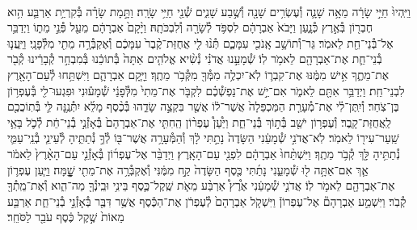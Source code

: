 \documentclass[twoside, openany, parskip=half, 11pt]{book}
\begin{document}
\begin{footnotesize}
\begin{multicols}{2}
\\
וַיִּֽהְיוּ֙ חַיֵּ֣י שָׂרָ֔ה מֵאָ֥ה שָׁנָ֛ה וְ֯עֶשְׂרִ֥ים שָׁנָ֖ה וְ֯שֶׁ֣בַע שָׁנִ֑ים שְׁ֯נֵ֖י חַיֵּ֥י שָׂרָֽה׃ וַתָּ֣מָת שָׂרָ֗ה בְּ֯קִרְיַ֥ת אַרְבַּ֛ע הִ֥וא חֶבְר֖וֹן בְּ֯אֶ֣רֶץ כְּ֯נָ֑עַן וַיָּבֹא֙ אַבְרָהָ֔ם לִסְפֹּ֥ד לְ֯שָׂרָ֖ה וְ֯לִבְכֹּתָֽהּ׃ וַיָּ֨קָם֙ אַבְרָהָ֔ם מֵעַ֖ל פְּ֯נֵ֣י מֵת֑וֹ וַיְדַבֵּ֥ר אֶל־בְּ֯נֵי־חֵ֖ת לֵאמֹֽר׃ גֵּר־וְ֯תוֹשָׁ֥ב אָֽנֹכִ֖י עִמָּכֶ֑ם תְּ֯נ֨וּ לִ֤י אֲחֻזַּת־קֶ֨בֶר֙ עִמָּכֶ֔ם וְ֯אֶקְבְּ֯רָ֥ה מֵתִ֖י מִלְּ֯פָנָֽי׃ וַיַּֽעֲנ֧וּ בְ֯נֵי־חֵ֛ת אֶת־אַבְרָהָ֖ם לֵאמֹ֥ר לֽוֹ׃ שְׁ֯מָעֵ֣נוּ אֲדֹנִ֗י נְ֯שִׂ֨יא אֱלֹהִ֤ים אַתָּה֙ בְּ֯תוֹכֵ֔נוּ בְּ֯מִבְחַ֣ר קְ֯בָרֵ֔ינוּ קְ֯בֹ֖ר אֶת־מֵתֶ֑ךָ אִ֣ישׁ מִמֶּ֔נּוּ אֶת־קִבְר֛וֹ לֹֽא־יִכְלֶ֥ה מִמְּ֯ךָ֖ מִקְּ֯בֹ֥ר מֵתֶֽךָ׃ וַיָּ֧קָם אַבְרָהָ֛ם וַיִּשְׁתַּ֥חוּ לְ֯עַם־הָאָ֖רֶץ לִבְנֵי־חֵֽת׃  וַיְדַבֵּ֥ר אִתָּ֖ם לֵאמֹ֑ר אִם־יֵ֣שׁ אֶת־נַפְשְׁ֯כֶ֗ם לִקְבֹּ֤ר אֶת־מֵתִי֙ מִלְּ֯פָנַ֔י שְׁ֯מָע֕וּנִי וּפִגְעוּ־לִ֖י בְּ֯עֶפְר֥וֹן בֶּן־צֹֽחַר׃ וְ֯יִֽתֶּן־לִ֗י אֶת־מְ֯עָרַ֤ת הַמַּכְפֵּלָה֙ אֲשֶׁר־ל֔וֹ אֲשֶׁ֖ר בִּקְצֵ֣ה שָׂדֵ֑הוּ בְּ֯כֶ֨סֶף מָלֵ֜א יִתְּ֯נֶ֥נָּה לִּ֛י בְּ֯תֽוֹכֲכֶ֖ם לַֽאֲחֻזַּת־קָֽבֶר׃ וְ֯עֶפְר֥וֹן יֹשֵׁ֖ב בְּ֯ת֣וֹךְ בְּ֯נֵי־חֵ֑ת וַיַּ֩עַן֩ עֶפְר֨וֹן הַֽחִתִּ֤י אֶת־אַבְרָהָם֙ בְּ֯אָזְ֯נֵ֣י בְ֯נֵי־חֵ֔ת לְ֯כֹ֛ל בָּאֵ֥י שַֽׁעַר־עִיר֖וֹ לֵאמֹֽר׃ לֹֽא־אֲדֹנִ֣י שְׁ֯מָעֵ֔נִי הַשָּׂדֶה֙ נָתַ֣תִּי לָ֔ךְ וְ֯הַמְּ֯עָרָ֥ה אֲשֶׁר־בּ֖וֹ לְ֯ךָ֣ נְ֯תַתִּ֑יהָ לְ֯עֵינֵ֧י בְ֯נֵֽי־עַמִּ֛י נְ֯תַתִּ֥יהָ לָּ֖ךְ קְ֯בֹ֥ר מֵתֶֽךָ׃ וַיִּשְׁתַּ֨חוּ֙ אַבְרָהָ֔ם לִפְנֵ֖י עַם־הָאָֽרֶץ׃  וַיְדַבֵּ֨ר אֶל־עֶפְר֜וֹן בְּ֯אָזְ֯נֵ֤י עַם־הָאָ֨רֶץ֙ לֵאמֹ֔ר אַ֛ךְ אִם־אַתָּ֥ה ל֖וּ שְׁ֯מָעֵ֑נִי נָתַ֜תִּי כֶּ֤סֶף הַשָּׂדֶה֙ קַ֣ח מִמֶּ֔נִּי וְ֯אֶקְבְּ֯רָ֥ה אֶת־מֵתִ֖י שׇׇׇׇׇׇׇׇֽׁמָּה׃ וַיַּ֧עַן עֶפְר֛וֹן אֶת־אַבְרָהָ֖ם לֵאמֹ֥ר לֽוֹ׃ אֲדֹנִ֣י שְׁ֯מָעֵ֔נִי אֶ֩רֶץ֩ אַרְבַּ֨ע מֵאֹ֧ת שֶֽׁקֶל־כֶּ֛סֶף בֵּינִ֥י וּבֵֽינְ֯ךָ֖ מַה־הִ֑וא וְ֯אֶת־מֵֽתְ֯ךָ֖ קְ֯בֹֽר׃ וַיִּשְׁמַ֣ע אַבְרָהָם֘ אֶל־עֶפְרוֹן֒ וַיִּשְׁקֹ֤ל אַבְרָהָם֙ לְ֯עֶפְרֹ֔ן אֶת־הַכֶּ֕סֶף אֲשֶׁ֥ר דִּבֶּ֖ר בְּ֯אָזְ֯נֵ֣י בְ֯נֵי־חֵ֑ת אַרְבַּ֤ע מֵאוֹת֙ שֶׁ֣קֶל כֶּ֔סֶף עֹבֵ֖ר לַסֹּחֵֽר׃


\end{multicols}
\end{footnotesize}
\end{document}
